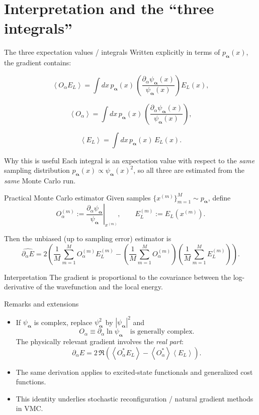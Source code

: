 \documentclass[aspectratio=169]{beamer}
\newcommand{\avg}[1]{\left\langle #1 \right\rangle}
\newcommand{\psia}{\psi_{\bm{\alpha}}}
\newcommand{\dalpha}{\partial_{\alpha}}
\newcommand{\El}{E_L}
\begin{document}
\section{Interpretation and the ``three integrals''}

\begin{frame}{The three expectation values / integrals}
Written explicitly in terms of $p_{\bm{\alpha}}(x)$, the gradient contains:

\[
\avg{O_\alpha \El}=\int dx\, p_{\bm{\alpha}}(x)\,
\left(\frac{\dalpha\psia(x)}{\psia(x)}\right)\El(x),
\]

\[
\avg{O_\alpha}=\int dx\, p_{\bm{\alpha}}(x)\,
\left(\frac{\dalpha\psia(x)}{\psia(x)}\right),
\]

\[
\avg{\El}=\int dx\, p_{\bm{\alpha}}(x)\,\El(x).
\]

\begin{block}{Why this is useful}
Each integral is an expectation value with respect to the \emph{same} sampling distribution
$p_{\bm{\alpha}}(x)\propto \psia(x)^2$, so all three are estimated from the \emph{same} Monte Carlo run.
\end{block}
\end{frame}

\begin{frame}{Practical Monte Carlo estimator}
Given samples $\{x^{(m)}\}_{m=1}^M \sim p_{\bm{\alpha}}$, define
\[
O_\alpha^{(m)} := \left.\frac{\dalpha\psia}{\psia}\right|_{x^{(m)}},
\qquad
\El^{(m)} := \El(x^{(m)}).
\]

Then the unbiased (up to sampling error) estimator is
\[
\widehat{\dalpha E}
=
2\left(
\frac{1}{M}\sum_{m=1}^M O_\alpha^{(m)}\El^{(m)}
-\left(\frac{1}{M}\sum_{m=1}^M O_\alpha^{(m)}\right)
\left(\frac{1}{M}\sum_{m=1}^M \El^{(m)}\right)
\right).
\]

\begin{block}{Interpretation}
The gradient is proportional to the covariance between the log-derivative of the wavefunction
and the local energy.
\end{block}
\end{frame}

\begin{frame}{Remarks and extensions}
\begin{itemize}
\item If $\psia$ is complex, replace $\psia^2$ by $|\psia|^2$ and
\[
O_\alpha \equiv \partial_\alpha \ln \psia \quad \text{is generally complex.}
\]
The physically relevant gradient involves the \emph{real part}:
\[
\partial_\alpha E = 2\,\Re\left(\avg{O_\alpha^\ast \El}-\avg{O_\alpha^\ast}\avg{\El}\right).
\]
\item The same derivation applies to excited-state functionals and generalized cost functions.
\item This identity underlies stochastic reconfiguration / natural gradient methods in VMC.
\end{itemize}
\end{frame}
\end{document}
